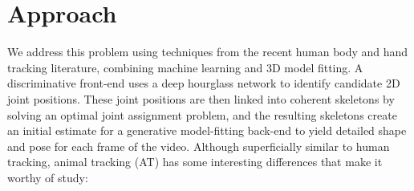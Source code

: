 

\section{Approach} %

We address this problem using techniques from the recent human body and
hand tracking literature, combining machine learning and 3D model fitting. A
discriminative front-end uses a deep hourglass network to identify candidate 2D
joint positions. These joint positions are then linked into coherent skeletons by
solving an optimal joint assignment problem, and the resulting skeletons create
an initial estimate for a generative model-fitting back-end to yield detailed shape
and pose for each frame of the video.
Although superficially similar to human tracking, animal tracking (AT) has
some interesting differences that make it worthy of study:

